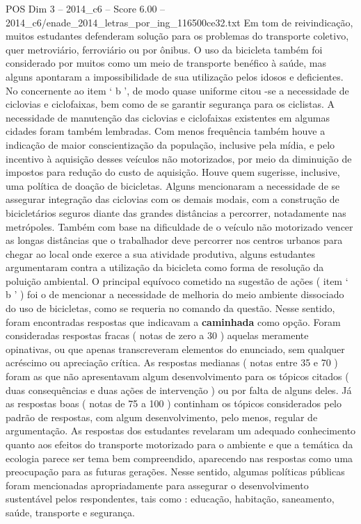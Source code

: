 \begin{textsample}{POS Dim 3 – 2014\_c6 – Score 6.00 – 2014\_c6/enade\_2014\_letras\_por\_ing\_116500ce32.txt}
Em tom de reivindicação, muitos estudantes defenderam solução para os problemas do transporte coletivo, quer metroviário, ferroviário ou por ônibus.
O uso da bicicleta também foi considerado por muitos como um meio de transporte benéfico à saúde, mas alguns apontaram a impossibilidade de sua utilização pelos idosos e deficientes.
No concernente ao item ‘ b ’, de modo quase uniforme citou -se a necessidade de ciclovias e ciclofaixas, bem como de se garantir segurança para os ciclistas.
A necessidade de manutenção das ciclovias e ciclofaixas existentes em algumas cidades foram também lembradas.
Com menos frequência também houve a indicação de maior conscientização da população, inclusive pela mídia, e pelo incentivo à aquisição desses veículos não motorizados, por meio da diminuição de impostos para redução do custo de aquisição.
Houve quem sugerisse, inclusive, uma política de doação de bicicletas.
Alguns mencionaram a necessidade de se assegurar integração das ciclovias com os demais modais, com a construção de bicicletários seguros diante das grandes distâncias a percorrer, notadamente nas metrópoles.
Também com base na dificuldade de o veículo não motorizado vencer as longas distâncias que o trabalhador deve percorrer nos centros urbanos para chegar ao local onde exerce a sua atividade produtiva, alguns estudantes argumentaram contra a utilização da bicicleta como forma de resolução da poluição ambiental.
O principal equívoco cometido na sugestão de ações ( item ‘ b ’ ) foi o de mencionar a necessidade de melhoria do meio ambiente dissociado do uso de bicicletas, como se requeria no comando da questão.
Nesse sentido, foram encontradas respostas que indicavam a \textbf{caminhada} como opção.
Foram consideradas respostas fracas ( notas de zero a 30 ) aquelas meramente opinativas, ou que apenas transcreveram elementos do enunciado, sem qualquer acréscimo ou apreciação crítica.
As respostas medianas ( notas entre 35 e 70 ) foram as que não apresentavam algum desenvolvimento para os tópicos citados ( duas consequências e duas ações de intervenção ) ou por falta de alguns deles.
Já as respostas boas ( notas de 75 a 100 ) continham os tópicos considerados pelo padrão de respostas, com algum desenvolvimento, pelo menos, regular de argumentação.
As respostas dos estudantes revelaram um adequado conhecimento quanto aos efeitos do transporte motorizado para o ambiente e que a temática da ecologia parece ser tema bem compreendido, aparecendo nas respostas como uma preocupação para as futuras gerações.
Nesse sentido, algumas políticas públicas foram mencionadas apropriadamente para assegurar o desenvolvimento sustentável pelos respondentes, tais como : educação, habitação, saneamento, saúde, transporte e segurança.

\end{textsample}
